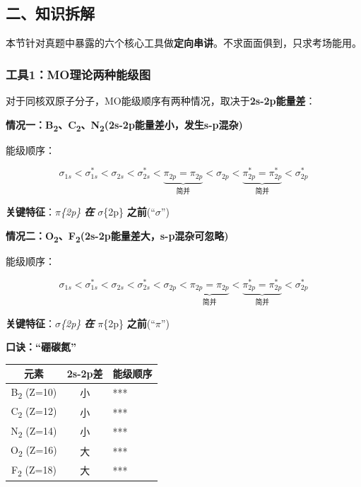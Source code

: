 \documentclass[a4paper,11pt]{ctexart}
\newcounter{none}
\newcommand{\箭}{\ensuremath{\rightarrow}}
\newcommand{\左箭}{\ensuremath{\leftarrow}}
\newcommand{\上箭}{\ensuremath{\uparrow}}
\newcommand{\下箭}{\ensuremath{\downarrow}}
\newcommand{\衡}{\ensuremath{\rightleftharpoons}}
\newcommand{\双箭}{\ensuremath{\leftrightarrow}}
\newcommand{\约等于}{\ensuremath{\approx}}
\newcommand{\小于等于}{\ensuremath{\leq}}
\newcommand{\大于等于}{\ensuremath{\geq}}
\newcommand{\不等于}{\ensuremath{\neq}}
\newcommand{\西格马}{\ensuremath{\sigma}}
\newcommand{\派}{\ensuremath{\pi}}
\begin{document}
\subsection{二、知识拆解}\label{ux4e8cux77e5ux8bc6ux62c6ux89e3-1}

本节针对真题中暴露的六个核心工具做\textbf{定向串讲}。不求面面俱到，只求考场能用。

\subsubsection{工具1：MO理论两种能级图}\label{ux5de5ux51771moux7406ux8bbaux4e24ux79cdux80fdux7ea7ux56fe}

对于同核双原子分子，MO能级顺序有两种情况，取决于\textbf{2s-2p能量差}：

\textbf{情况一：B\textsubscript{2}、C\textsubscript{2}、N\textsubscript{2}(2s-2p能量差小，发生s-p混杂)}

能级顺序：

\[\sigma_{1s} < \sigma^*_{1s} < \sigma_{2s} < \sigma^*_{2s} < \underbrace{\pi_{2p} = \pi_{2p}}_{简并} < \sigma_{2p} < \underbrace{\pi^*_{2p} = \pi^*_{2p}}_{简并} < \sigma^*_{2p}\]

\textbf{关键特征}：\派\emph{\{2p\} \textbf{在} \西格马}\{2p\} \textbf{之前}(``\西格马'')

\textbf{情况二：O\textsubscript{2}、F\textsubscript{2}(2s-2p能量差大，s-p混杂可忽略)}

能级顺序：

\[\sigma_{1s} < \sigma^*_{1s} < \sigma_{2s} < \sigma^*_{2s} < \sigma_{2p} < \underbrace{\pi_{2p} = \pi_{2p}}_{简并} < \underbrace{\pi^*_{2p} = \pi^*_{2p}}_{简并} < \sigma^*_{2p}\]

\textbf{关键特征}：\西格马\emph{\{2p\} \textbf{在} \派}\{2p\} \textbf{之前}(``\派'')

\textbf{口诀：``硼碳氮''}

{\def\LTcaptype{none} %
\begin{longtable}[]{@{}ccl@{}}
\toprule\noalign{}
元素 & 2s-2p差 & 能级顺序 \\
\midrule\noalign{}
\endhead
\bottomrule\noalign{}
\endlastfoot
B\textsubscript{2} (Z=10) & 小 & *** \\
C\textsubscript{2} (Z=12) & 小 & *** \\
N\textsubscript{2} (Z=14) & 小 & *** \\
O\textsubscript{2} (Z=16) & 大 & *** \\
F\textsubscript{2} (Z=18) & 大 & *** \\
\end{longtable}
}
\end{document}
